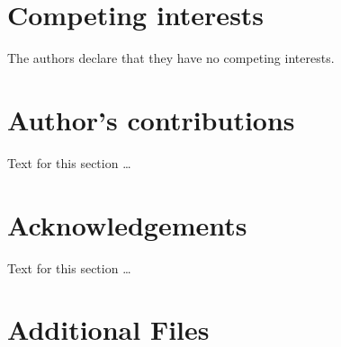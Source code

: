 \documentclass{bmcart}
\begin{document}
\begin{backmatter}

\section*{Competing interests}
  The authors declare that they have no competing interests.

\section*{Author's contributions}
    Text for this section \ldots

\section*{Acknowledgements}
  Text for this section \ldots






\section*{Additional Files}

\end{backmatter}
\end{document}
